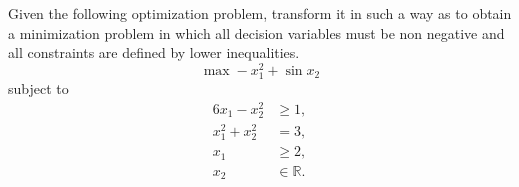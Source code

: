 
Given the following optimization problem, transform it in such a
  way as to obtain a minimization problem in which all decision
  variables must be non negative and all constraints are defined by lower
  inequalities.
\[
\max -x_1^2+\sin x_2
\]
subject to
\begin{align*}
6x_1-x_2^2 &\geq 1, \\
x_1^2+x_2^2 &=3, \\
x_1 &\geq 2, \\
x_2 & \in \mathbb{R}.
\end{align*}




